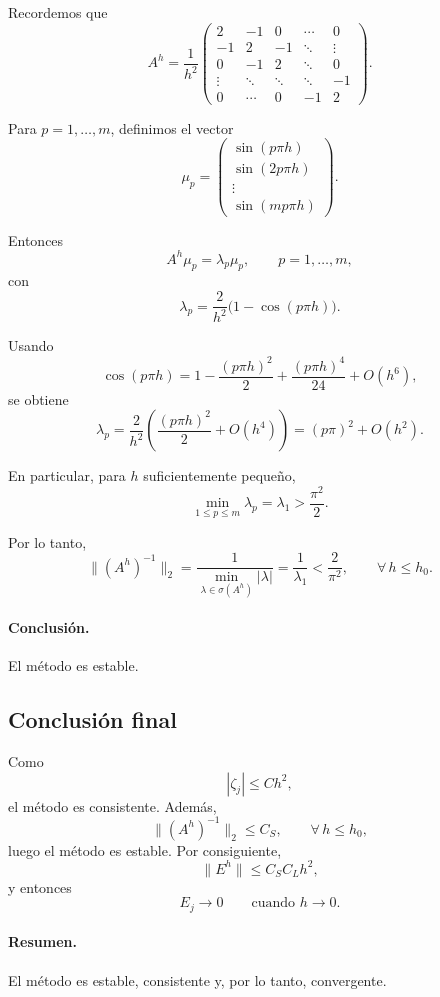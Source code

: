 Recordemos que
\[
A^h=\frac{1}{h^2}
\begin{pmatrix}
2 & -1 & 0 & \cdots & 0\\
-1 & 2 & -1 & \ddots & \vdots\\
0 & -1 & 2 & \ddots & 0\\
\vdots & \ddots & \ddots & \ddots & -1\\
0 & \cdots & 0 & -1 & 2
\end{pmatrix}.
\]

Para \(p=1,\dots,m\), definimos el vector
\[
\mu_p=
\begin{pmatrix}
\sin(p\pi h)\\
\sin(2p\pi h)\\
\vdots\\
\sin(mp\pi h)
\end{pmatrix}.
\]

Entonces
\[
A^h\mu_p=\lambda_p\mu_p,
\qquad p=1,\dots,m,
\]
con
\[
\lambda_p
=
\frac{2}{h^2}\bigl(1-\cos(p\pi h)\bigr).
\]

Usando
\[
\cos(p\pi h)=1-\frac{(p\pi h)^2}{2}+\frac{(p\pi h)^4}{24}+O(h^6),
\]
se obtiene
\[
\lambda_p
=
\frac{2}{h^2}\left(\frac{(p\pi h)^2}{2}+O(h^4)\right)
=
(p\pi)^2+O(h^2).
\]

En particular, para \(h\) suficientemente pequeño,
\[
\min_{1\le p\le m}\lambda_p=\lambda_1>\frac{\pi^2}{2}.
\]

Por lo tanto,
\[
\|(A^h)^{-1}\|_2
=
\frac{1}{\min_{\lambda\in\sigma(A^h)}|\lambda|}
=
\frac{1}{\lambda_1}
<
\frac{2}{\pi^2},
\qquad \forall\, h\le h_0.
\]

\paragraph{Conclusión.}
El método es estable.

\subsection{Conclusión final}

Como
\[
|\zeta_j|\le Ch^2,
\]
el método es consistente. Además,
\[
\|(A^h)^{-1}\|_2\le C_S,
\qquad \forall\, h\le h_0,
\]
luego el método es estable. Por consiguiente,
\[
\|E^h\|\le C_S C_L h^2,
\]
y entonces
\[
E_j\longrightarrow 0
\qquad \text{cuando } h\to 0.
\]

\paragraph{Resumen.}
El método es estable, consistente y, por lo tanto, convergente.